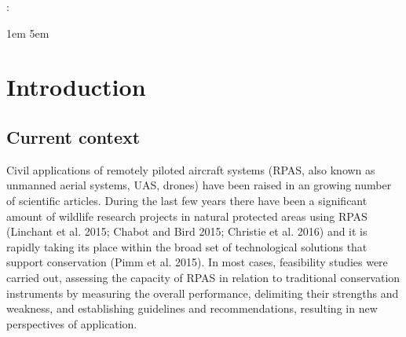 \documentclass[]{interact}
\theoremstyle{plain}%
\theoremstyle{definition}
\theoremstyle{remark}
\begin{document}
    
 : \par
  \begingroup
  \leftskip1em
  \rightskip\leftskip
  \rightskip5em
  \par
  \endgroup
  \vspace{5mm}


% 

\vskip 6.5pt

\noindent  \section{Introduction}\label{introduction}

\subsection{Current context}\label{current-context}

Civil applications of remotely piloted aircraft systems (RPAS, also
known as unmanned aerial systems, UAS, drones) have been raised in an
growing number of scientific articles. During the last few years there
have been a significant amount of wildlife research projects in natural
protected areas using RPAS (Linchant et al. 2015; Chabot and Bird 2015;
Christie et al. 2016) and it is rapidly taking its place within the
broad set of technological solutions that support conservation (Pimm et
al. 2015). In most cases, feasibility studies were carried out,
assessing the capacity of RPAS in relation to traditional conservation
instruments by measuring the overall performance, delimiting their
strengths and weakness, and establishing guidelines and recommendations,
resulting in new perspectives of application.
\end{document}
